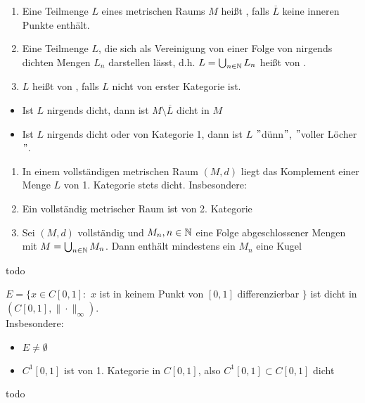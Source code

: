 \begin{definition} \label{def:9.2}
	\begin{enumerate}[label=\alph*\upshape)]
		\label{def:9.2a}
		\item Eine Teilmenge $L$ eines metrischen Raums $M$ hei{\ss}t , falls $\overline{L}$ keine inneren Punkte enthält.
		\label{def:9.2b}
		\item Eine Teilmenge $L$, die sich als Vereinigung von einer Folge von nirgends dichten Mengen $L_{n}$ darstellen lässt, d.h. $L = \bigcup_{n \in \mathbb{N}} L_{n}$ hei{\ss}t von .
		\label{def:9.2c}
		\item $L$ hei{\ss}t von , falls $L$ nicht von erster Kategorie ist.
	\end{enumerate}
\end{definition}

\begin{bemerkung*}
	\begin{itemize}
		\item Ist $L$ nirgends dicht, dann ist $M \setminus \overline{L}$ dicht in $M$
		\item Ist $L$ nirgends dicht oder von Kategorie 1, dann ist $L$ $"$dünn$"$, $"$voller Löcher$"$.
	\end{itemize}	
\end{bemerkung*}

\begin{kor} \label{kor:9.3-KategoriensatzVonBaire}
	\begin{enumerate}[label=\alph*\upshape)]
		\item In einem vollständigen metrischen Raum $(M, d)$ liegt das Komplement einer Menge $L$ von 1. Kategorie stets dicht. Insbesondere:
		\item Ein vollständig metrischer Raum ist von 2. Kategorie
		\item Sei $(M, d)$ vollständig und $M_{n}, n \in \mathbb{N}$ eine Folge abgeschlossener Mengen mit $M = \bigcup_{n \in \mathbb{N}} M_{n}$. Dann enthält mindestens ein $M_{n}$ eine Kugel
	\end{enumerate}	
\end{kor}

\begin{beweis}
	todo %
\end{beweis}

\begin{satz}
	$E = \{ x \in C[0, 1]:$ $x$ ist in keinem Punkt von $[0, 1]$ differenzierbar $\}$ ist dicht in $(C[0, 1], \| \cdot \|_{\infty})$. \\
	Insbesondere:
 		\begin{itemize}
			\item $E \neq \emptyset$
			\item $C^{1}[0, 1]$ ist von 1. Kategorie in $C[0, 1]$, also $C^{1}[0, 1] \subset C[0, 1]$ dicht
		\end{itemize}
\end{satz}

\begin{beweis}
	todo %
\end{beweis}




